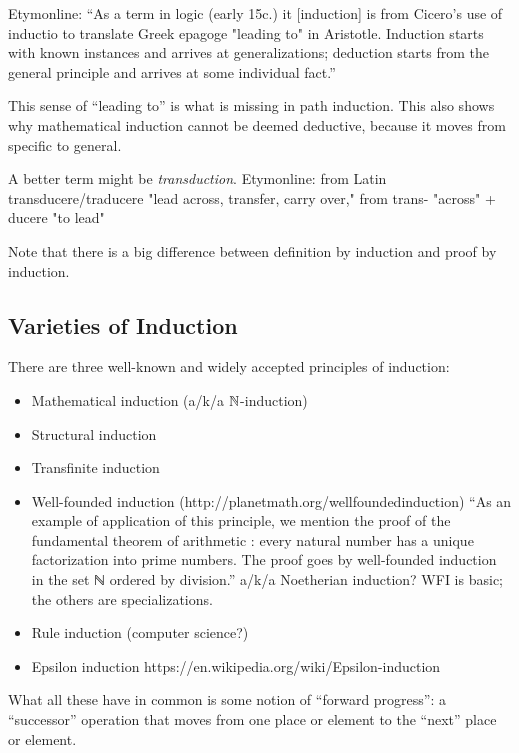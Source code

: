 \documentclass{article}
\begin{document}
Etymonline: ``As a term in logic (early 15c.) it [induction] is from
Cicero's use of inductio to translate Greek epagoge "leading to" in
Aristotle. Induction starts with known instances and arrives at
generalizations; deduction starts from the general principle and
arrives at some individual fact.''

This sense of ``leading to'' is what is missing in path induction.
This also shows why mathematical induction cannot be deemed deductive,
because it moves from specific to general.

A better term might be \emph{transduction}.  Etymonline: from Latin
transducere/traducere "lead across, transfer, carry over," from trans-
"across" + ducere "to lead"

\begin{remark}
  Note that there is a big difference between definition by induction
  and proof by induction.
\end{remark}

\subsection{Varieties of Induction}

There are three well-known and widely accepted principles of induction:

\begin{itemize}
\item Mathematical induction (a/k/a \(\mathbb{N}\)-induction)
\item Structural induction
\item Transfinite induction
\item Well-founded induction (http://planetmath.org/wellfoundedinduction)
  ``As an example of application of this principle, we mention the proof of the fundamental theorem of arithmetic : every natural number has a unique factorization into prime numbers. The proof goes by well-founded induction in the set ℕ ordered by division.''
  a/k/a Noetherian induction?
  WFI is basic; the others are specializations.
\item Rule induction (computer science?)
\item Epsilon induction https://en.wikipedia.org/wiki/Epsilon-induction
\end{itemize}

What all these have in common is some notion of ``forward progress'':
a ``successor'' operation that moves from one place or element to the
``next'' place or element.
\end{document}

